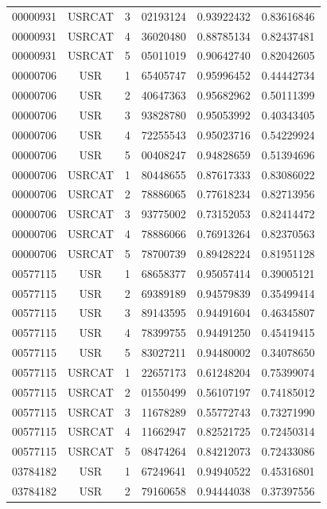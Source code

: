 \begin{longtable}{cccccc}
00000931 & USRCAT & 3 & 02193124 & 0.93922432 & 0.83616846\\
00000931 & USRCAT & 4 & 36020480 & 0.88785134 & 0.82437481\\
00000931 & USRCAT & 5 & 05011019 & 0.90642740 & 0.82042605\\
\hline
00000706 & USR    & 1 & 65405747 & 0.95996452 & 0.44442734\\%
00000706 & USR    & 2 & 40647363 & 0.95682962 & 0.50111399\\
00000706 & USR    & 3 & 93828780 & 0.95053992 & 0.40343405\\
00000706 & USR    & 4 & 72255543 & 0.95023716 & 0.54229924\\
00000706 & USR    & 5 & 00408247 & 0.94828659 & 0.51394696\\
00000706 & USRCAT & 1 & 80448655 & 0.87617333 & 0.83086022\\%
00000706 & USRCAT & 2 & 78886065 & 0.77618234 & 0.82713956\\
00000706 & USRCAT & 3 & 93775002 & 0.73152053 & 0.82414472\\
00000706 & USRCAT & 4 & 78886066 & 0.76913264 & 0.82370563\\
00000706 & USRCAT & 5 & 78700739 & 0.89428224 & 0.81951128\\
\hline
00577115 & USR    & 1 & 68658377 & 0.95057414 & 0.39005121\\%
00577115 & USR    & 2 & 69389189 & 0.94579839 & 0.35499414\\
00577115 & USR    & 3 & 89143595 & 0.94491604 & 0.46345807\\
00577115 & USR    & 4 & 78399755 & 0.94491250 & 0.45419415\\
00577115 & USR    & 5 & 83027211 & 0.94480002 & 0.34078650\\
00577115 & USRCAT & 1 & 22657173 & 0.61248204 & 0.75399074\\%
00577115 & USRCAT & 2 & 01550499 & 0.56107197 & 0.74185012\\
00577115 & USRCAT & 3 & 11678289 & 0.55772743 & 0.73271990\\
00577115 & USRCAT & 4 & 11662947 & 0.82521725 & 0.72450314\\
00577115 & USRCAT & 5 & 08474264 & 0.84212073 & 0.72433086\\
\hline
03784182 & USR    & 1 & 67249641 & 0.94940522 & 0.45316801\\%
03784182 & USR    & 2 & 79160658 & 0.94444038 & 0.37397556\\

\end{longtable}
